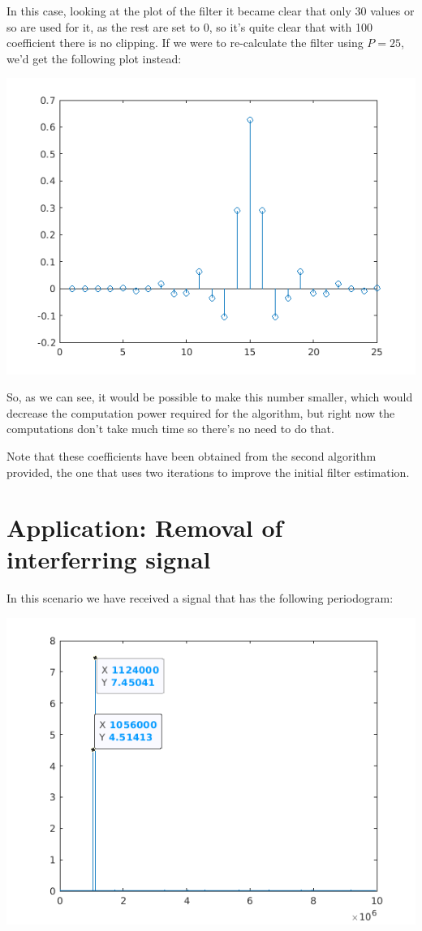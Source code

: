 \documentclass[conference,9pt]{IEEEtran}
\begin{document}
In this case, looking at the plot of the filter it became clear that only 30 values or so are used for it, as the rest are set to 0, so it's quite clear that with 100 coefficient there is no clipping. If we were to re-calculate the filter using $P=25$, we'd get the following plot instead:

\includegraphics[scale=0.6]{coef25.png}

So, as we can see, it would be possible to make this number smaller, which would decrease the computation power required for the algorithm, but right now the computations don't take much time so there's no need to do that.

Note that these coefficients have been obtained from the second algorithm provided, the one that uses two iterations to improve the initial filter estimation.








\section{Application: Removal of interferring signal}
In this scenario we have received a signal that has the following periodogram:

\includegraphics[scale=0.6]{perio.png}
\end{document}
